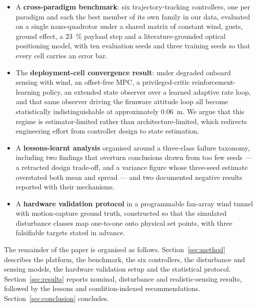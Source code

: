 \begin{itemize}
\item A \textbf{cross-paradigm benchmark}: six trajectory-tracking controllers, one per
      paradigm and each the best member of its own family in our data, evaluated on a
      single nano-quadrotor under a shared matrix of constant wind, gusts, ground
      effect, a \SI{23}{\percent} payload step and a literature-grounded optical
      positioning model, with ten evaluation seeds and three training seeds so that
      every cell carries an error bar.
\item The \textbf{deployment-cell convergence result}: under degraded onboard sensing
      with wind, an offset-free MPC, a privileged-critic reinforcement-learning policy,
      an extended state observer over a learned adaptive rate loop, and that same
      observer driving the firmware attitude loop all become statistically
      indistinguishable at approximately \SI{0.06}{\meter}. We argue that
      this regime is estimator-limited rather than architecture-limited, which redirects
      engineering effort from controller design to state estimation.
\item A \textbf{lessons-learnt analysis} organised around a three-class failure taxonomy,
      including two findings that overturn conclusions drawn from too few seeds --- a
      retracted design trade-off, and a variance figure whose three-seed estimate
      overstated both mean and spread --- and two documented negative results reported
      with their mechanisms.
\item A \textbf{hardware validation protocol} in a programmable fan-array wind tunnel
      with motion-capture ground truth, constructed so that the simulated disturbance
      classes map one-to-one onto physical set points, with three falsifiable targets
      stated in advance.
\end{itemize}

The remainder of the paper is organised as follows. Section~\ref{sec:method} describes
the platform, the benchmark, the six controllers, the disturbance and sensing models,
the hardware validation setup and the statistical protocol.
Section~\ref{sec:results} reports nominal, disturbance and realistic-sensing results,
followed by the lessons and condition-indexed recommendations.
Section~\ref{sec:conclusion} concludes.
